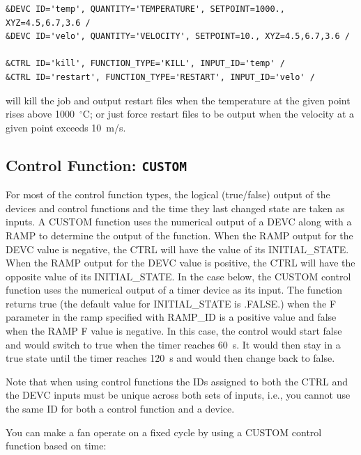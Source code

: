 \documentclass[11pt]{book}
\begin{document}
\begin{lstlisting}
&DEVC ID='temp', QUANTITY='TEMPERATURE', SETPOINT=1000., XYZ=4.5,6.7,3.6 /
&DEVC ID='velo', QUANTITY='VELOCITY', SETPOINT=10., XYZ=4.5,6.7,3.6 /

&CTRL ID='kill', FUNCTION_TYPE='KILL', INPUT_ID='temp' /
&CTRL ID='restart', FUNCTION_TYPE='RESTART', INPUT_ID='velo' /
\end{lstlisting}

\noindent
will kill the job and output restart files when the temperature at the given point rises above
1000~$^\circ$C; or just force restart files to be output when the velocity at a given point exceeds 10~m/s.



\subsection{Control Function: \texorpdfstring{{\tt CUSTOM}}{CUSTOM} }
\label{info:CUSTOM}

For most of the control function types, the logical (true/false) output of
the devices and control functions and the time they last changed
state are taken as inputs.  A {\ct CUSTOM} function uses the numerical output of a {\ct DEVC} along with
a {\ct RAMP} to determine the output of the function.  When the {\ct RAMP} output for the {\ct DEVC} value is negative, the
{\ct CTRL} will have the value of its {\ct INITIAL\_STATE}.  When the {\ct RAMP} output for the {\ct DEVC} value is positive, the
{\ct CTRL} will have the opposite value of its {\ct INITIAL\_STATE}. In the case below, the {\ct CUSTOM}
control function uses the numerical output of a timer device as its input.  The function returns true (the default value for
{\ct INITIAL\_STATE} is {\ct .FALSE.}) when the {\ct F} parameter
in the ramp specified with {\ct RAMP\_ID} is a positive value and
false when the {\ct RAMP} {\ct F} value is negative.
In this case, the control would start false and would switch to
true when the timer reaches 60~s.  It would then stay in a true
state until the timer reaches 120~s and would then change back to false.


Note that when using control functions the {\ct ID}s assigned to both the
{\ct CTRL} and the {\ct DEVC} inputs must be unique across both sets of inputs, i.e., you cannot use the
same {\ct ID} for both a control function and a device.

You can make a fan operate on a fixed cycle by using a {\ct CUSTOM} control function based on time:
\end{document}
